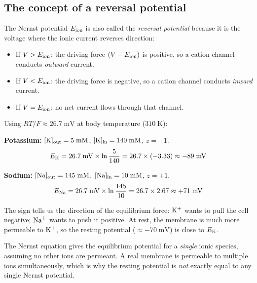 \subsection{The concept of a reversal potential}

The Nernst potential $E_{\mathrm{\text{ion}}}$ is also called the \emph{reversal potential} because it is the voltage where the ionic current reverses direction:
%
\begin{itemize}
  \item If $V > E_{\mathrm{\text{ion}}}$: the driving force $(V - E_{\mathrm{\text{ion}}})$ is positive, so a cation channel conducts \emph{outward} current.
  \item If $V < E_{\mathrm{\text{ion}}}$: the driving force is negative, so a cation channel conducts \emph{inward} current.
  \item If $V = E_{\mathrm{\text{ion}}}$: no net current flows through that channel.
\end{itemize}

\begin{aside}
Using $RT/F \approx 26.7\;\text{mV}$ at body temperature ($310\;\text{K}$):

\textbf{Potassium:} $[\mathrm{K}]_{\text{out}} = 5\;\text{mM}$, $[\mathrm{K}]_{\text{in}} = 140\;\text{mM}$, $z = +1$.
\[
  E_{\mathrm{K}} = 26.7\;\text{mV} \times \ln\frac{5}{140}
           = 26.7 \times (-3.33)
           \approx -89\;\text{mV}
\]

\textbf{Sodium:} $[\mathrm{Na}]_{\text{out}} = 145\;\text{mM}$, $[\mathrm{Na}]_{\text{in}} = 10\;\text{mM}$, $z = +1$.
\[
  E_{\mathrm{Na}} = 26.7\;\text{mV} \times \ln\frac{145}{10}
            = 26.7 \times 2.67
            \approx +71\;\text{mV}
\]

The sign tells us the direction of the equilibrium force: $\mathrm{K}^+$ wants to pull the cell negative; $\mathrm{Na}^+$ wants to push it positive. At rest, the membrane is much more permeable to $\mathrm{K}^+$, so the resting potential ($\approx -70\;\text{mV}$) is close to $E_{\mathrm{K}}$.
\end{aside}

\begin{aside}
The Nernst equation gives the equilibrium potential for a \emph{single} ionic species, assuming no other ions are permeant. A real membrane is permeable to multiple ions simultaneously, which is why the resting potential is \emph{not} exactly equal to any single Nernst potential.
\end{aside}


